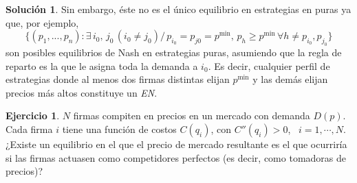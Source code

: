 \documentclass[a4paper, 11pt]{article}
\theoremstyle{definition}
\newtheorem{ejercicio}{Ejercicio}
\newtheorem{solucion}{Soluci\'on}
\begin{document}
\begin{solucion}
Sin embargo, éste no es el único equilibrio en estrategias en puras ya que, por ejemplo,
\vspace*{-4pt}
\[ \{(p_1,...,p_n):\exists \, i_0 , \, j_0 \,  (i_0\neq j_0) / \, p_{i_0}= p_{j0}=p^{\min{}}, \, p_h \geq p^{\min{}} \, \forall h \neq p_{i_0}, p_{j_0}\}\]
\vspace*{-4pt}
\noindent son posibles equilibrios de Nash en estrategias puras, asumiendo que la regla de reparto es la que le asigna toda la demanda a  $i_0$. Es decir, cualquier perfil de estrategias donde al menos dos firmas distintas elijan $p^{\min{}}$ y las demás elijan precios más altos constituye un \textit{EN}.
\vspace*{-12pt}
\end{solucion}

\begin{ejercicio} %
 $N$ firmas compiten en precios en un mercado con demanda $D(p)$. Cada firma $i$ tiene una función de costos $C(q_i)$, con $C''(q_i) > 0$, \, $i = 1, \cdots , N$.
¿Existe un equilibrio en el que el precio de mercado resultante es el que ocurriría si las firmas actuasen como competidores perfectos (es decir, como tomadoras de precios)?
\end{ejercicio}
\end{document}
